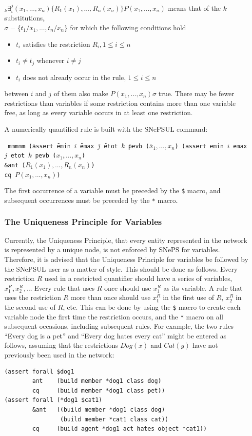 \documentclass{book}
\begin{document}
$ _k\exists_i^j (x_1, \ldots, x_n) \{R_1(x_1), \ldots, R_n(x_n)\}
P(x_1, \ldots, x_n)$ means that of the $k$ substitutions,\\
$\sigma=\{t_1/x_1, \ldots, t_n/x_n\}$ for which the following
conditions hold
\begin{itemize}
\item $t_i$ satisfies the restriction $R_i, 1 \leq i \leq n$
\item $t_i \neq t_j$ whenever $i \neq j$
\item $t_i$ does not already occur in the rule, $1 \leq i \leq n$
\end{itemize}
between $i$ and $j$ of them also make $P(x_1, \ldots, x_n)\sigma$ true.  There
may be fewer restrictions than
variables if some restriction contains more than one variable free, as long as every variable occurs
in at least one restriction.

A numerically quantified rule is built with the SNePSUL command:
\begin{tabbing} \tt
mmmmm \=(assert \=emin \=$i$ \=emax \=$j$ \=etot \=$k$ \=pevb \=($x_1, \ldots, x_n$) \kill
      \>(assert \>emin \>$i$ \>emax \>$j$ \>etot \>$k$ \>pevb \>($x_1, \ldots, x_n$) \\
      \>        \>\&ant  \> ($R_1(x_1), \ldots, R_n(x_n)$) \\
      \>        \>cq     \> $P(x_1, \ldots, x_n)$)
\end{tabbing}

The first occurrence of a variable must be preceded by the \verb|$| macro, and subsequent occurrences must
be preceded by the \verb|*| macro.

\subsubsection{The Uniqueness Principle for Variables} 
Currently, the
Uniqueness Principle, that every entity represented in the network is
represented by a unique node, is not enforced by SNePS for variables.
Therefore, it is advised that the Uniqueness Principle for variables
be followed by the SNePSUL user as a matter of style.  This should be
done as follows.  Every restriction $R$ used in a restricted
quantifier should have a series of variables, $x^R_1, x^R_2, \ldots$
Every rule that uses $R$ once should use $x^R_1$ as its variable.  A
rule that uses the restriction $R$ more than once should use $x^R_1$
in the first use of $R$, $x^R_2$ in the second use of $R$, etc.  This
can be done by using the \verb|$| macro to create each variable node
the first time the restriction occurs, and the \verb|*| macro on all
subsequent occasions, including subsequent rules.  For example, the
two rules ``Every dog is a pet'' and ``Every dog hates every cat''
might be entered as follows, assuming that the restrictions $Dog(x)$
and $Cat(y)$ have not previously been used in the network:
\begin{verbatim}
(assert forall $dog1 
        ant    (build member *dog1 class dog) 
        cq     (build member *dog1 class pet))
(assert forall (*dog1 $cat1)
        &ant   ((build member *dog1 class dog)
                (build member *cat1 class cat)) 
        cq     (build agent *dog1 act hates object *cat1))
\end{verbatim}
\end{document}
